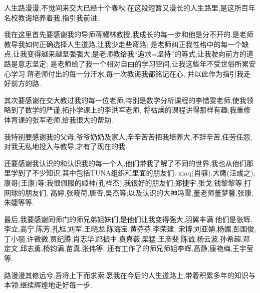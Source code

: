 人生路漫漫,不觉间来交大已经十个春秋.在这段短暂又漫长的人生路里,是这所百年名校教诲培养着我,指引我前进.

我在这里首先要感谢我的导师蒋耀林教授,我成长的每一步和他是分不开的.是老师教导我如何正确选择人生道路,让我少走些弯路;
是老师纠正我性格中的每一个缺点,让我变得越来越坚强强大;是老师教给我``追求=坚持''的等式,让我驶向前方的道路是意志坚定;
是老师给了我一个相对自由的学习空间,让我这些年不受世俗所累安心学习.蒋老师付出的每一分汗水,每一次教诲我都铭记在心,
并以此作为指引我走好前方的路.

其次要感谢在交大教过我的每一位老师,特别是数学分析课程的李惜雯老师,使我领略到了数学的严谨;拓扑学课上的李洪军老师,
将枯燥的课程讲得那样有趣;我重修体育课的张军老师,给我很大的帮助.

我特别要感谢我的父母,爷爷奶奶及家人,辛辛苦苦把我培养大,不辞辛苦,任劳任怨,对我无私地投入与教导,才有了现在的我.

还要感谢我认识的和认识我的每一个人,他们带我了解了不同的世界,我也从他们那里学到了不少知识.其中包括TUNA组织和里面的朋友们,
xiaq(肖骐),大鹰(汪彧之),康哥(王康)等;我很佩服的姬神(孔祥杰);我很好的朋友们,郑捷宇,张戈,钱黎黎等;打网球的朋友们,
高婷,张晓荷,唐杏,吴杰等;以及认识的大神冯雪,董老师董梦馨,张康,朱婕等等.

最后,我要感谢同师门的师兄弟姐妹们,是他们让我变得强大,羽翼丰满.他们是张辉,李立,高宁,陈芳,孔旭,刘军,王晓龙,陈海宝,黄芬芬,李荣建,
宋博,刘亚婧,杨媚,彭国俊,丁小丽,许微微,贾纪腾,肖志华,祁振中,袁嘉薇,梁猛,王彦斐,陈诚,杨云波,孙希超,邓定文,邱志勇,杨钧满,苗真,张伟等.
还有工作了的师兄师姐李辉,高静,康艳梅,王宇莹等.

路漫漫其修远兮,吾将上下而求索.愿我在今后的人生道路上,带着积累多年的知识与本领,继续辉煌地走好每一步.
